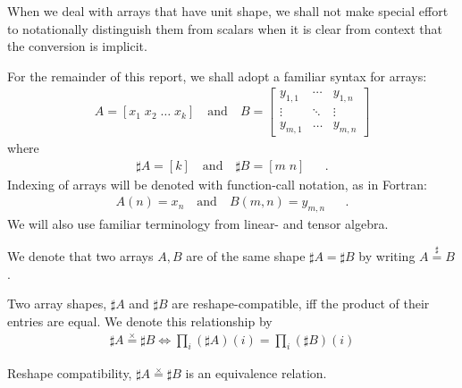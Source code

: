\documentclass{DIKU-report-variant}
\newcommand\sharpeq{\stackrel{\sharp}{=}}
\newcommand\prodeq{\stackrel{\times}{=}}
\begin{document}
\begin{remark}
  \label{rem:scalar}
  When we deal with arrays that have unit shape, we shall not make special effort
  to notationally distinguish them from scalars when it is clear from context that
  the conversion is implicit.
\end{remark}

\begin{example}
  \label{ex:syntax}
  For the remainder of this report, we shall adopt a familiar syntax for arrays:
  \begin{align*}
    A = [ x_1\; x_2\; \dots \; x_k ] \quad \text{and} \quad
    B = \begin{bmatrix}
      y_{1,1} & \cdots & y_{1,n} \\
      \vdots & \ddots & \vdots \\
      y_{m,1} & \dots  & y_{m,n} 
    \end{bmatrix}
  \end{align*}
  where
  \begin{align*}
    \sharp A = [k] \quad \text{and} \quad \sharp B = [ m\; n ] && .
  \end{align*}
  Indexing of arrays will be denoted with function-call notation, as in Fortran:
  \begin{align*}
    A(n) = x_n \quad \text{and} \quad B(m,n) = y_{m,n} && .
  \end{align*}
  We will also use familiar terminology from linear- and tensor algebra.
\end{example}

\begin{definition}
  \label{def:sheq} 
  We denote that two arrays \(A, B\) are of the same shape \(\sharp A = \sharp B\)
  by writing \(A \sharpeq B\).
\end{definition}

\begin{definition}
  \label{def:reshape-comp} 
  Two array shapes, \(\sharp A\) and \(\sharp B\) are reshape-compatible, iff the product
  of their entries are equal. We denote this relationship by 
  \begin{align*}
    \sharp A \prodeq \sharp B \iff
    \prod_{i} (\sharp A)(i) = \prod_{i} (\sharp B)(i)
  \end{align*}
\end{definition}

\begin{theorem}
  \label{the:reshape-comp-eq}
  Reshape compatibility, \(\sharp A \prodeq \sharp B\) is an equivalence relation. 
\end{theorem}
\end{document}
